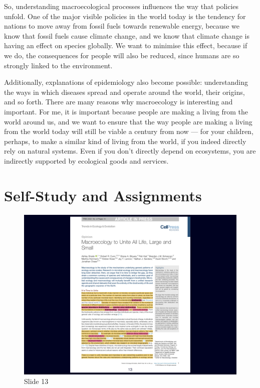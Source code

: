 \documentclass[
  11pt,
]{book}
\begin{document}
So, understanding macroecological processes influences the way that
policies unfold. One of the major visible policies in the world today is
the tendency for nations to move away from fossil fuels towards
renewable energy, because we know that fossil fuels cause climate
change, and we know that climate change is having an effect on species
globally. We want to minimise this effect, because if we do, the
consequences for people will also be reduced, since humans are so
strongly linked to the environment.

Additionally, explanations of epidemiology also become possible:
understanding the ways in which diseases spread and operate around the
world, their origins, and so forth. There are many reasons why
macroecology is interesting and important. For me, it is important
because people are making a living from the world around us, and we want
to ensure that the way people are making a living from the world today
will still be viable a century from now --- for your children, perhaps,
to make a similar kind of living from the world, if you indeed directly
rely on natural systems. Even if you don't directly depend on
ecosystems, you are indirectly supported by ecological goods and
services.

\section{Self-Study and Assignments}\label{self-study-and-assignments}

\begin{figure}[ht]
\centering
\includegraphics[width=0.8\linewidth]{../images/BDC334/BDC334-013.jpeg}
\caption*{Slide 13}
\end{figure}
\end{document}
